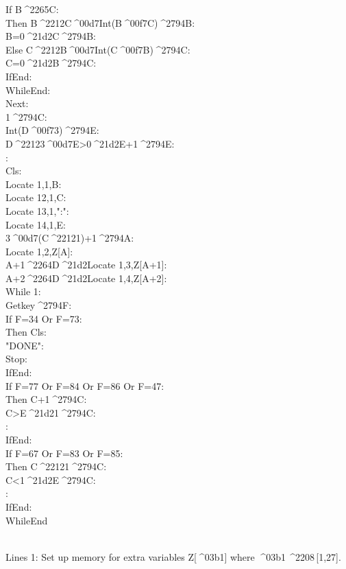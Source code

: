 \documentclass[11pt,letterpaper,twocolumn]{article}
\newcommand{\STO}{{\large ^^^^2794}}
\newcommand{\CBR}{{\Large ^^^^21d2}}
\newcommand{\LEQ}{^^^^2264}
\newcommand{\GEQ}{^^^^2265}
\newcommand{\MUL}{^^^^00d7}
\newcommand{\DIV}{^^^^00f7}
\newcommand{\MINUS}{^^^^2212}
\newcommand{\ELEM}{^^^^2208}
\newcommand{\ALPHA}{^^^^03b1}
\newcommand{\IDENT}[1]{\hspace*{#1\BaseIndent}}
\begin{document}
\begin{linenumbers}
\IDENT{2}If B\GEQ C:\\
\IDENT{3}Then B\MINUS C\MUL Int(B\DIV C)\STO B:\\
\IDENT{3}B=0\CBR C\STO B:\\
\IDENT{2}Else C\MINUS B\MUL Int(C\DIV B)\STO C:\\
\IDENT{3}C=0\CBR B\STO C:\\
\IDENT{2}IfEnd:\\
\IDENT{1}WhileEnd:\\
Next:\\
1\STO C:\\
Int(D\DIV 3)\STO E:\\
D\MINUS 3\MUL E>0\CBR E+1\STO E:\\
:\\
Cls:\\
Locate 1,1,B:\\
Locate 12,1,C:\\
Locate 13,1,":":\\
Locate 14,1,E:\\
3\MUL (C\MINUS 1)+1\STO A:\\
Locate 1,2,Z[A]:\\
A+1\LEQ D\CBR Locate 1,3,Z[A+1]:\\
A+2\LEQ D\CBR Locate 1,4,Z[A+2]:\\
While 1:\\
\IDENT{1}Getkey\STO F:\\
\IDENT{1}If F=34 Or F=73:\\
\IDENT{2}Then Cls:\\
\IDENT{2}"DONE":\\
\IDENT{2}Stop:\\
\IDENT{1}IfEnd:\\
\IDENT{1}If F=77 Or F=84 Or F=86 Or F=47:\\
\IDENT{2}Then C+1\STO C:\\
\IDENT{2}C>E\CBR 1\STO C:\\
\IDENT{2}:\\
\IDENT{1}IfEnd:\\
\IDENT{1}If F=67 Or F=83 Or F=85:\\
\IDENT{2}Then C\MINUS 1\STO C:\\
\IDENT{2}C<1\CBR E\STO C:\\
\IDENT{2}:\\
\IDENT{1}IfEnd:\\
WhileEnd
\end{linenumbers}

\\
Lines 1: Set up memory for extra variables Z[\ALPHA] where \ALPHA\,\ELEM \,[1,27].
\end{document}
